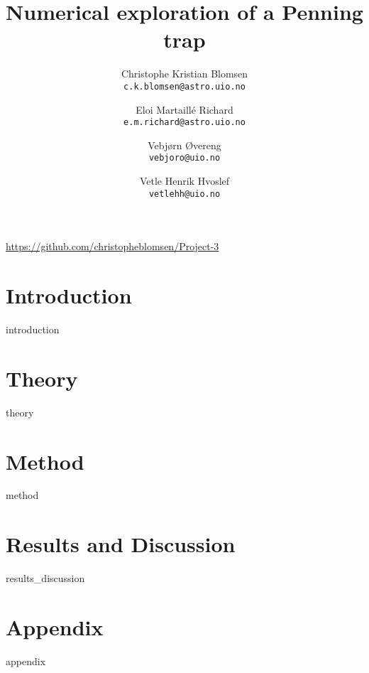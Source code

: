 \documentclass[a4paper,10pt,english]{article}
\title{Numerical exploration of a Penning trap}
\author{Christophe Kristian Blomsen\\
        \texttt{c.k.blomsen@astro.uio.no}
        \and
        Eloi Martaillé Richard\\
        \texttt{e.m.richard@astro.uio.no}
        \and
        Vebjørn Øvereng\\
        \texttt{vebjoro@uio.no}
        \and
        Vetle Henrik Hvoslef\\
        \texttt{vetlehh@uio.no}}
\begin{document}
  \maketitle
  \centering \href{https://github.com/christopheblomsen/Project-3}{https://github.com/christopheblomsen/Project-3}


\section{Introduction}
{introduction}
\section{Theory}
{theory}

\section{Method}
{method}

\section{Results and Discussion}\label{sec:results}
{results_discussion}

\section{Appendix}\label{sec:app}
{appendix}

\newpage
\newpage
\printbibliography[heading=bibintoc, title={References}]

\end{document}

